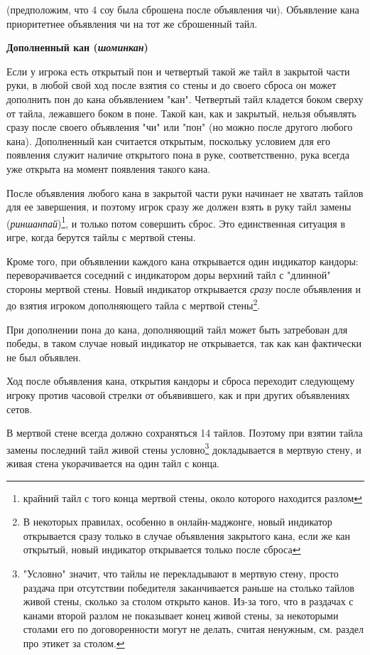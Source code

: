  \hfill {}

(предположим, что 4 соу была сброшена после объявления чи). Объявление кана приоритетнее объявления чи на тот же сброшенный тайл.

\textbf{Дополненный кан (\textit{шоминкан})}

Если у игрока есть открытый пон и четвертый такой же тайл в закрытой части руки, в любой свой ход после взятия со стены и до своего сброса он может дополнить пон до кана объявлением "кан". Четвертый тайл кладется боком сверху от тайла, лежавшего боком в поне. Такой кан, как и закрытый, нельзя объявлять сразу после своего объявления "чи" или "пон" (но можно после другого любого кана). Дополненный кан считается открытым, поскольку условием для его появления служит наличие открытого пона в руке, соответственно, рука всегда уже открыта на момент появления такого кана.


После объявления любого кана в закрытой части руки начинает не хватать тайлов для ее завершения, и поэтому игрок сразу же должен взять в руку тайл замены (\textit{риншанпай})\footnote{крайний тайл с того конца мертвой стены, около которого находится разлом}, и только потом совершить сброс. Это единственная ситуация в игре, когда берутся тайлы с мертвой стены. 

Кроме того, при объявлении каждого кана открывается один индикатор кандоры: переворачивается соседний с индикатором доры верхний тайл с "длинной" стороны мертвой стены. Новый индикатор открывается \textit{сразу} после объявления и до взятия игроком дополняющего тайла с мертвой стены\footnote{В некоторых правилах, особенно в онлайн-маджонге, новый индикатор открывается сразу только в случае объявления закрытого кана, если же кан открытый, новый индикатор открывается только после сброса}. 

При дополнении пона до кана, дополняющий тайл может быть затребован для победы, в таком случае новый индикатор не открывается, так как кан фактически не был объявлен.

Ход после объявления кана, открытия кандоры и сброса переходит следующему игроку против часовой стрелки от объявившего, как и при других объявлениях сетов. 

В мертвой стене всегда должно сохраняться 14 тайлов. Поэтому при взятии тайла замены последний тайл живой стены условно\footnote{"Условно" значит, что тайлы не перекладывают в мертвую стену, просто раздача при отсутствии победителя заканчивается раньше на столько тайлов живой стены, сколько за столом открыто канов. Из-за того, что в раздачах с канами второй разлом не показывает конец живой стены, за некоторыми столами его по договоренности могут не делать, считая ненужным, см. раздел про этикет за столом.} докладывается в мертвую стену, и живая стена укорачивается на один тайл с конца.

